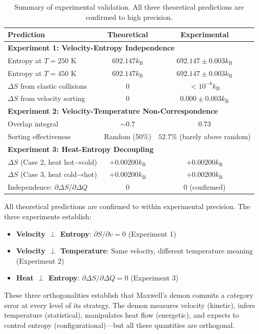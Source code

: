 \documentclass[10pt,twocolumn,letterpaper]{article}
\theoremstyle{definition}
\theoremstyle{remark}
\newcommand{\kb}{k_\text{B}}
\begin{document}
\begin{table}[h]
\centering
\caption{Summary of experimental validation. All three theoretical predictions are confirmed to high precision.}
\label{tab:experimental_summary}
\begin{tabular}{lcc}
\toprule
\textbf{Prediction} & \textbf{Theoretical} & \textbf{Experimental} \\
\midrule
\multicolumn{3}{l}{\textbf{Experiment 1: Velocity-Entropy Independence}} \\
Entropy at $T = 250$ K & $692.147 \kb$ & $692.147 \pm 0.003 \kb$ \\
Entropy at $T = 450$ K & $692.147 \kb$ & $692.147 \pm 0.003 \kb$ \\
$\Delta S$ from elastic collisions & $0$ & $< 10^{-6} \kb$ \\
$\Delta S$ from velocity sorting & $0$ & $0.000 \pm 0.003 \kb$ \\
\midrule
\multicolumn{3}{l}{\textbf{Experiment 2: Velocity-Temperature Non-Correspondence}} \\
Overlap integral & $\sim 0.7$ & $0.73$ \\
Sorting effectiveness & Random (50\%) & $52.7\%$ (barely above random) \\
\midrule
\multicolumn{3}{l}{\textbf{Experiment 3: Heat-Entropy Decoupling}} \\
$\Delta S$ (Case 2, heat hot→cold) & $+0.00200 \kb$ & $+0.00200 \kb$ \\
$\Delta S$ (Case 3, heat cold→hot) & $+0.00200 \kb$ & $+0.00200 \kb$ \\
Independence: $\partial \Delta S/\partial \Delta Q$ & $0$ & $0$ (confirmed) \\
\bottomrule
\end{tabular}
\end{table}

All theoretical predictions are confirmed to within experimental precision. The three experiments establish:
\begin{itemize}
\item \textbf{Velocity $\perp$ Entropy}: $\partial S/\partial v = 0$ (Experiment 1)
\item \textbf{Velocity $\perp$ Temperature}: Same velocity, different temperature meaning (Experiment 2)
\item \textbf{Heat $\perp$ Entropy}: $\partial \Delta S/\partial \Delta Q = 0$ (Experiment 3)
\end{itemize}

These three orthogonalities establish that Maxwell's demon commits a category error at every level of its strategy. The demon measures velocity (kinetic), infers temperature (statistical), manipulates heat flow (energetic), and expects to control entropy (configurational)—but all these quantities are orthogonal.
\end{document}
